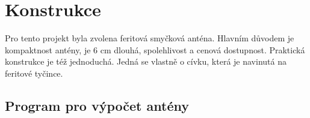 \newpage

\section{Konstrukce}

Pro tento projekt byla zvolena feritová smyčková anténa. Hlavním důvodem je kompaktnost
antény, je 6 cm dlouhá, spolehlivost a cenová dostupnost. Praktická konstrukce je též
jednoduchá. Jedná se vlastně o cívku, která je navinutá na feritové tyčince.

\subsection{Program pro výpočet antény}

